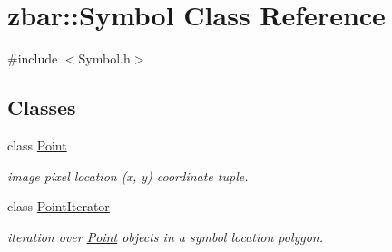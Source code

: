 \hypertarget{classzbar_1_1_symbol}{
\section{zbar::Symbol Class Reference}
\label{classzbar_1_1_symbol}
}


{\ttfamily \#include $<$Symbol.h$>$}

\subsection*{Classes}
\begin{DoxyCompactItemize}
\item 
class \hyperlink{classzbar_1_1_symbol_1_1_point}{Point}
\begin{DoxyCompactList}\small\item\em image pixel location (x, y) coordinate tuple. \end{DoxyCompactList}\item 
class \hyperlink{classzbar_1_1_symbol_1_1_point_iterator}{PointIterator}
\begin{DoxyCompactList}\small\item\em iteration over \hyperlink{classzbar_1_1_symbol_1_1_point}{Point} objects in a symbol location polygon. \end{DoxyCompactList}\end{DoxyCompactItemize}
